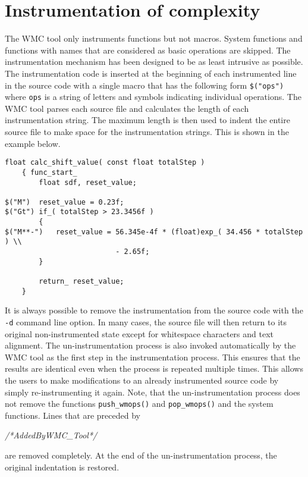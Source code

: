 \section{Instrumentation of complexity}
\label{ch:instrumentation_of_complexity}

The WMC tool only instruments functions but not macros. System functions and functions with names that are considered as basic operations are skipped. The instrumentation mechanism has been designed to be as least intrusive as possible. The instrumentation code is inserted at the beginning of each instrumented line in the source code with a single macro that has the following form \verb|$("ops")| where \verb|ops| is a string of letters and symbols indicating individual operations. The WMC tool parses each source file and calculates the length of each instrumentation string. The maximum length is then used to indent the entire source file to make space for the instrumentation strings. This is shown in the example below.

\begin{Verbatim}[fontsize=\small]
    float calc_shift_value( const float totalStep )
    { func_start_
        float sdf, reset_value;

$("M")  reset_value = 0.23f;
$("Gt") if_( totalStep > 23.3456f )
        {
$("M**-")   reset_value = 56.345e-4f * (float)exp_( 34.456 * totalStep ) \\
                          - 2.65f;
        }

        return_ reset_value;
    }
\end{Verbatim}

It is always possible to remove the instrumentation from the source code with the \verb|-d| command line option. In many cases, the source file will then return to its original non-instrumented state except for whitespace characters and text alignment. The un-instrumentation process is also invoked automatically by the WMC tool as the first step in the instrumentation process. This ensures that the results are identical even when the process is repeated multiple times. This allows the users to make modifications to an already instrumented source code by simply re-instrumenting it again. Note, that the un-instrumentation process does not remove the functions \verb|push_wmops()| and \verb|pop_wmops()| and the system functions. Lines that are preceded by

{
{\em /*AddedByWMC\_Tool*/}
}

are removed completely. At the end of the un-instrumentation process, the original indentation is restored.

